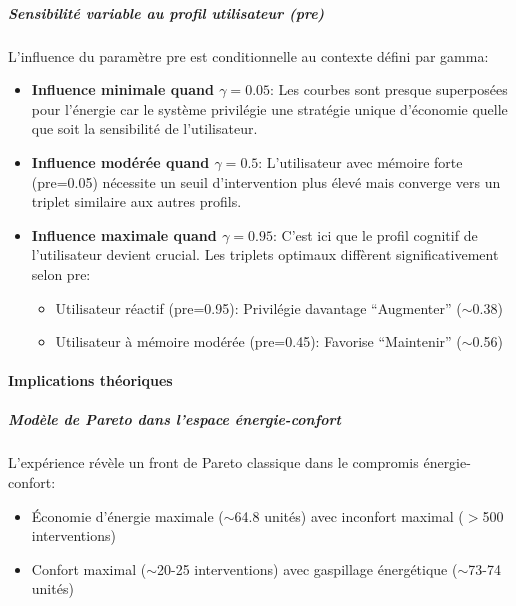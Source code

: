 \documentclass[a4paper,11pt]{article}
\begin{document}
\vspace{2cm}
\subparagraph{Sensibilité variable au profil utilisateur (pre)}
L'influence du paramètre pre est conditionnelle au contexte défini par gamma:

\begin{itemize}
    \item \textbf{Influence minimale quand $\gamma=0.05$}: Les courbes sont presque superposées pour l'énergie car le système privilégie une stratégie unique d'économie quelle que soit la sensibilité de l'utilisateur.
    
    \item \textbf{Influence modérée quand $\gamma=0.5$}: L'utilisateur avec mémoire forte (pre=0.05) nécessite un seuil d'intervention plus élevé mais converge vers un triplet similaire aux autres profils.
    
    \item \textbf{Influence maximale quand $\gamma=0.95$}: C'est ici que le profil cognitif de l'utilisateur devient crucial. Les triplets optimaux diffèrent significativement selon pre:
    \begin{itemize}
        \item Utilisateur réactif (pre=0.95): Privilégie davantage ``Augmenter'' ($\sim$0.38)
        \item Utilisateur à mémoire modérée (pre=0.45): Favorise ``Maintenir'' ($\sim$0.56)
    \end{itemize}
\end{itemize}

\paragraph{Implications théoriques}

\subparagraph{Modèle de Pareto dans l'espace énergie-confort}
L'expérience révèle un front de Pareto \cite{pareto} classique dans le compromis énergie-confort:
\begin{itemize}
    \item Économie d'énergie maximale ($\sim$64.8 unités) avec inconfort maximal ($>$500 interventions)
    \item Confort maximal ($\sim$20-25 interventions) avec gaspillage énergétique ($\sim$73-74 unités)
\end{itemize}
\end{document}
